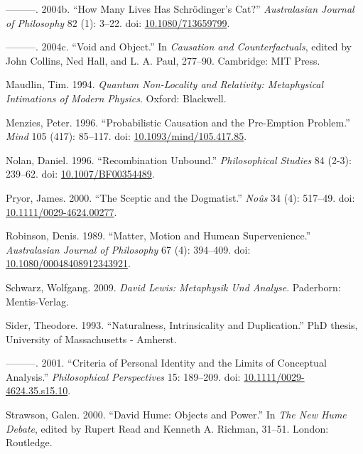 \documentclass[
  10pt,
  letterpaper,
  DIV=11,
  numbers=noendperiod,
  twoside]{scrartcl}
\newlength{\cslhangindent}
\newenvironment{CSLReferences}[2] %
 {\begin{list}{}{%
  \setlength{\itemindent}{0pt}
  \setlength{\leftmargin}{0pt}
  \setlength{\parsep}{0pt}
  \ifodd #1
   \setlength{\leftmargin}{\cslhangindent}
   \setlength{\itemindent}{-1\cslhangindent}
  \fi
  \setlength{\itemsep}{#2\baselineskip}}}
 {\end{list}}
\begin{document}
\begin{CSLReferences}{1}{0}
---------. 2004b. {``How Many Lives Has {S}chrödinger's Cat?''}
\emph{Australasian Journal of Philosophy} 82 (1): 3--22. doi:
\href{https://doi.org/10.1080/713659799}{10.1080/713659799}.

---------. 2004c. {``Void and Object.''} In \emph{Causation and
Counterfactuals}, edited by John Collins, Ned Hall, and L. A. Paul,
277--90. Cambridge: {MIT} Press.

Maudlin, Tim. 1994. \emph{Quantum Non-Locality and Relativity:
Metaphysical Intimations of Modern Physics}. Oxford: Blackwell.

Menzies, Peter. 1996. {``Probabilistic Causation and the Pre-Emption
Problem.''} \emph{Mind} 105 (417): 85--117. doi:
\href{https://doi.org/10.1093/mind/105.417.85}{10.1093/mind/105.417.85}.

Nolan, Daniel. 1996. {``{Recombination Unbound}.''} \emph{Philosophical
Studies} 84 (2-3): 239--62. doi:
\href{https://doi.org/10.1007/BF00354489}{10.1007/BF00354489}.

Pryor, James. 2000. {``The Sceptic and the Dogmatist.''} \emph{No{û}s}
34 (4): 517--49. doi:
\href{https://doi.org/10.1111/0029-4624.00277}{10.1111/0029-4624.00277}.

Robinson, Denis. 1989. {``Matter, Motion and Humean Supervenience.''}
\emph{Australasian Journal of Philosophy} 67 (4): 394--409. doi:
\href{https://doi.org/10.1080/00048408912343921}{10.1080/00048408912343921}.

Schwarz, Wolfgang. 2009. \emph{David Lewis: Metaphysik Und Analyse}.
Paderborn: Mentis-Verlag.

Sider, Theodore. 1993. {``Naturalness, Intrinsicality and
Duplication.''} PhD thesis, University of Massachusetts - Amherst.

---------. 2001. {``Criteria of Personal Identity and the Limits of
Conceptual Analysis.''} \emph{Philosophical Perspectives} 15: 189--209.
doi:
\href{https://doi.org/10.1111/0029-4624.35.s15.10}{10.1111/0029-4624.35.s15.10}.

Strawson, Galen. 2000. {``David Hume: Objects and Power.''} In \emph{The
New Hume Debate}, edited by Rupert Read and Kenneth A. Richman, 31--51.
London: Routledge.


\end{CSLReferences}
\end{document}
